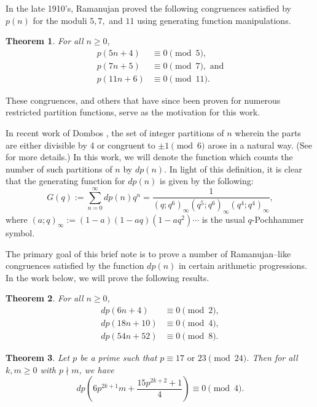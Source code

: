 \documentclass{amsart}
\newtheorem{theorem}{Theorem}[section]
\begin{document}
In the late 1910's, Ramanujan \cite{Ramanujan} proved the following congruences satisfied by $p(n)$ for the moduli $5, 7,$ and $11$ using generating function manipulations. 

\begin{theorem}%
    For all $n\geq 0$, 
    \begin{align*}
        p(5n+4) &\equiv 0 \pmod{5}, \\
        p(7n+5) &\equiv 0 \pmod{7}, \text { and}\\
        p(11n+6) &\equiv 0 \pmod{11}.
    \end{align*}
\end{theorem}
These congruences, and others that have since been proven for numerous restricted partition functions, serve as the motivation for this work.  

In recent work of Dombos \cite{Dombos}, the set of integer partitions of $n$ wherein the parts are either divisible by 4 or congruent to $\pm 1 \pmod{6}$ arose in a natural way.  (See \cite[Theorem 1.6]{Dombos} for more details.)  In this work, we will denote the function which counts the number of such partitions of $n$ by $dp(n)$.  In light of this definition, it is clear that the generating function for $dp(n)$ is given by the following:  
\begin{equation}
G(q):=\sum_{n=0}^{\infty} dp(n)q^n = \frac{1}{(q;q^6)_\infty (q^5;q^6)_\infty (q^4;q^4)_\infty},
\label{gf1}
\end{equation}
where $(a;q)_\infty := (1-a)(1-aq)(1-aq^{2})\cdots$
is the usual $q$-Pochhammer symbol. 

The primary goal of this brief note is to prove a number of Ramanujan--like congruences satisfied by the function $dp(n)$ in certain arithmetic progressions.  In the work below, we will prove the following results. 

\begin{theorem}
For all $n \geq 0$,
	\begin{align}
	dp(6n+4) & \equiv 0 \pmod{2}, \label{c1} \\ 
    dp(18n+10) & \equiv 0 \pmod{4}, \label{c3} \\
    dp(54n+52) &  \equiv 0 \pmod{8}. \label{c4}
    \end{align}
\label{Th1}
\end{theorem}

\begin{theorem} Let $p$ be a prime such that $p \equiv 17 \mbox{ or } 23 \pmod{24}$. Then for all $k,m \geq 0$ with $p \nmid m$, we have
\begin{equation*}
dp\left( 6p^{2k+1}m + \frac{15p^{2k+2}+1}{4} \right) \equiv 0 \pmod{4}.
\end{equation*}
\label{Th2}
\end{theorem}
\end{document}
